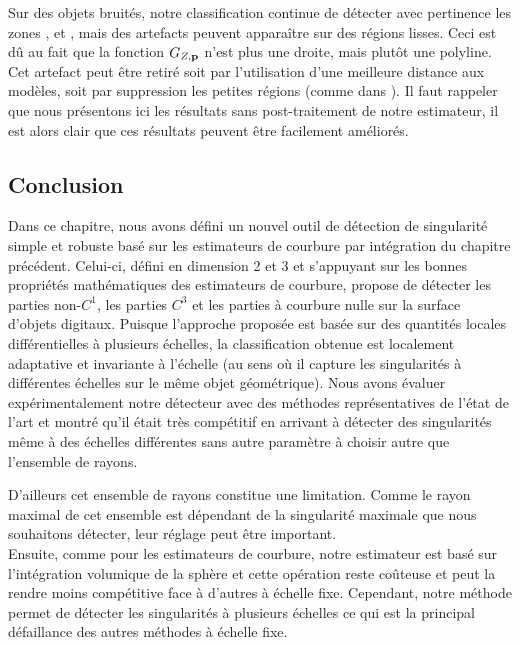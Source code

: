 Sur des objets bruités, notre classification continue de détecter avec
pertinence les zones \featedge, \featsmooth et \featflat, mais des artefacts
peuvent apparaître sur des régions lisses. Ceci est dû au fait que la fonction
$G_{Z,\mathbf{p}}$ n'est plus une droite, mais plutôt une polyline. Cet artefact peut
être retiré soit par l'utilisation d'une meilleure distance aux modèles, soit
par suppression les petites régions \featedge (comme dans \cite{Park2012}). Il
faut rappeler que nous présentons ici les résultats sans post-traitement de
notre estimateur, il est alors clair que ces résultats peuvent être facilement
améliorés.
%
\subsection{Conclusion}
%
Dans ce chapitre, nous avons défini un nouvel outil de détection de singularité
simple et robuste basé sur les estimateurs de courbure par intégration du
chapitre précédent. Celui-ci, défini en dimension 2 et 3 et s'appuyant sur les
bonnes propriétés mathématiques des estimateurs de courbure, propose de détecter
les parties non-$C^1$, les parties $C^3$ et les parties à courbure nulle sur la
surface d'objets digitaux. Puisque l'approche proposée est basée sur des
quantités locales différentielles à plusieurs échelles, la classification
obtenue est localement adaptative et invariante à l'échelle (au sens où il
capture les singularités à différentes échelles sur le même objet géométrique).
Nous avons évaluer expérimentalement notre détecteur avec des méthodes
représentatives de l'état de l'art et montré qu'il était très compétitif en
arrivant à détecter des singularités même à des échelles différentes sans autre
paramètre à choisir autre que l'ensemble de rayons.


D'ailleurs cet ensemble de rayons constitue une limitation. Comme le rayon
maximal de cet ensemble est dépendant de la singularité maximale que nous
souhaitons détecter, leur réglage peut être important. \\
%
Ensuite, comme pour les estimateurs de courbure, notre estimateur est basé sur
l'intégration volumique de la sphère et cette opération reste coûteuse et peut
la rendre moins compétitive face à d'autres à échelle fixe. Cependant, notre
méthode permet de détecter les singularités à plusieurs échelles ce qui est la
principal défaillance des autres méthodes à échelle fixe.


